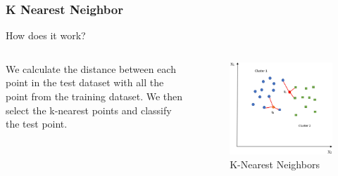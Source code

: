 \begin{frame}
\frametitle{K Nearest Neighbor}
\begin{center}
    How does it work?
\end{center}
\begin{columns}
    \begin{column}{0.5\textwidth}
        We calculate the distance between each point in the test dataset with all the point from
        the training dataset. We then select the k-nearest points and classify the test point.
    \end{column}

    \begin{column}{0.45\textwidth}
        \begin{figure}
            \centering
            \includegraphics[width=1\textwidth]{media/1stAssignment/knn_example.png}
            \caption{K-Nearest Neighbors}
        \end{figure}
    \end{column}
\end{columns}
\end{frame}


